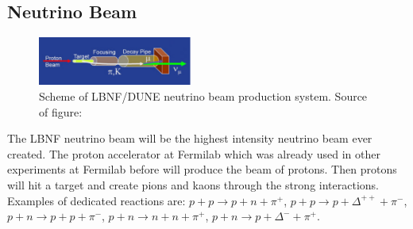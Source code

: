 \subsection{Neutrino Beam}

\begin{figure}
\caption{Scheme of LBNF/DUNE neutrino beam production system. Source of figure: \cite{ref_LBNFweb}}
\label{fig:LBNF_nuBeam}
\centering
\includegraphics[width=0.45\textwidth, keepaspectratio=true]{figs/LBNF_nuBeam.png}  
\end{figure}


The LBNF neutrino beam will be the highest intensity neutrino beam ever created. The proton accelerator at Fermilab which was already used in other experiments at Fermilab before will produce the beam of protons. Then protons will hit a target and create pions and kaons through the strong interactions. Examples of dedicated reactions are: $p+p \rightarrow p+n+\pi^+$, $p+p \rightarrow p+\Delta^{++}+\pi^-$, $p+n \rightarrow p+p+\pi^-$, $p+n \rightarrow n+n+\pi^+$, $p+n \rightarrow p+\Delta^{-}+\pi^+$. 



